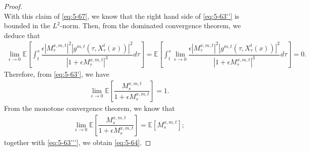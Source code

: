 \documentclass[11pt]{article}
\numberwithin{equation}{section}
\newcommand{\e}{\mathbb{E}}
\newcommand{\1}{\mbox{1\hspace{-1mm}I}}
\begin{document}
\begin{proof}
\begin{equation}
\end{equation}
With this claim of  \eqref{eq:5-67}, we know that the right hand side of \eqref{eq:5-63''} is bounded in the $L^2$-norm.
Then, from the dominated convergence theorem, we deduce that 
\begin{align*}
    \lim_{\epsilon\to 0}\e\left[\int_{t}^{s}\dfrac{\epsilon \left|M^{x,m,t}_\tau\right|^{2}\left|g^{m,t}\left(\tau, X^{t}_\tau(x) \right)\right|^{2}}{\left|1+\epsilon M^{x,m,t}_\tau \right|^{3}}d\tau \right] = \e\left[\int_{t}^{s}\lim_{\epsilon\to 0}\dfrac{\epsilon \left|M^{x,m,t}_\tau\right|^{2}\left|g^{m,t}\left(\tau, X^{t}_\tau(x) \right)\right|^{2}}{\left|1+\epsilon M^{x,m,t}_\tau \right|^{3}}d\tau \right] = 0.
\end{align*}
Therefore, from \eqref{eq:5-63'}, we have
\begin{align}\label{eq:5-63'''}
    \lim_{\epsilon\to 0}\e\left[\dfrac{M^{x,m,t}_s}{1+\epsilon M^{x,m,t}_s}\right]=1.
\end{align}
From the monotone convergence theorem, we know that
\begin{align*}
    \lim_{\epsilon\to 0}\e\left[\dfrac{M^{x,m,t}_s}{1+\epsilon M^{x,m,t}_s}\right]=\e\left[M^{x,m,t}_s\right];
\end{align*}
together with \eqref{eq:5-63'''}, we obtain \eqref{eq:5-64}.


\end{proof}
\end{document}
